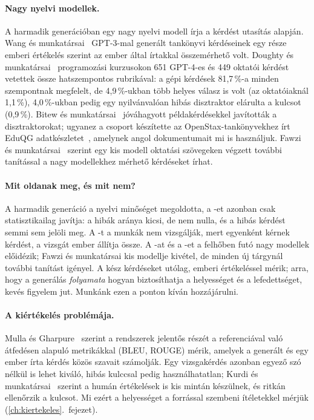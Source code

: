 \paragraph{Nagy nyelvi modellek.} A harmadik generációban egy nagy nyelvi modell írja a kérdést utasítás
alapján. Wang és munkatársai~\cite{wang2022towards} GPT-3-mal generált tankönyvi kérdéseinek egy része
emberi értékelés szerint az ember által írtakkal összemérhető volt. Doughty és
munkatársai~\cite{doughty2024comparative} programozási kurzusokon 651 GPT-4-es és 449 oktatói kérdést
vetettek össze hatszempontos rubrikával: a gépi kérdések 81,7\,\%-a minden szempontnak megfelelt, de
4,9\,\%-ukban több helyes válasz is volt (az oktatóiaknál 1,1\,\%), 4,0\,\%-ukban pedig egy nyilvánvalóan
hibás disztraktor elárulta a kulcsot (0,9\,\%). Bitew és munkatársai~\cite{bitew2023distractor} jóváhagyott
példakérdésekkel javították a disztraktorokat; ugyanez a csoport készítette az OpenStax-tankönyvekhez írt
EduQG adatkészletet~\cite{hadifar2023eduqg}, amelynek angol dokumentumait mi is használjuk. Fawzi és
munkatársai~\cite{fawzi2023small} szerint egy kis modell oktatási szövegeken végzett további tanítással a
nagy modellekhez mérhető kérdéseket írhat.

\paragraph{Mit oldanak meg, és mit nem?} A harmadik generáció a nyelvi minőséget megoldotta, a -et
azonban csak statisztikailag javítja: a hibák aránya kicsi, de nem nulla, és a hibás kérdést semmi sem
jelöli meg. A -t a munkák nem vizsgálják, mert egyenként kérnek kérdést, a vizsgát ember állítja
össze. A -at és a -et a felhőben futó nagy modellek előidézik; Fawzi és munkatársai kis modellje
kivétel, de minden új tárgynál további tanítást igényel. A kész kérdéseket utólag, emberi értékeléssel
mérik; arra, hogy a generálás \emph{folyamata} hogyan biztosíthatja a helyességet és a lefedettséget,
kevés figyelem jut. Munkánk ezen a ponton kíván hozzájárulni.

\paragraph{A kiértékelés problémája.} Mulla és Gharpure~\cite{mulla2023aqg} szerint a rendszerek jelentős
részét a referenciával való átfedésen alapuló metrikákkal (BLEU, ROUGE) mérik, amelyek a generált és egy ember írta
kérdés közös szavait számolják. Egy vizsgakérdés azonban egyező szó nélkül is lehet kiváló, hibás
kulccsal pedig használhatatlan; Kurdi és munkatársai~\cite{kurdi2020systematic} szerint a humán értékelések
is kis mintán készülnek, és ritkán ellenőrzik a kulcsot. Mi ezért a helyességet a forrással szembeni
ítéletekkel mérjük (\ref{ch:kiertekeles}.~fejezet).

